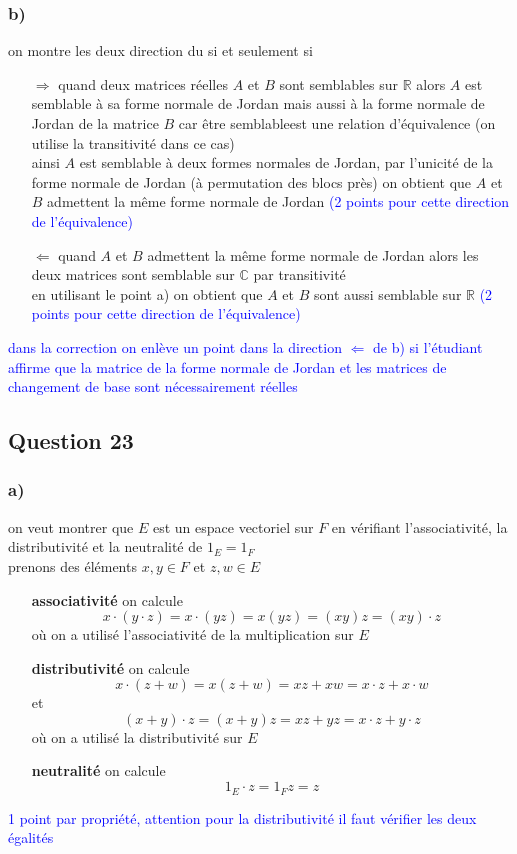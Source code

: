 \documentclass[11pt, a4paper, oneside]{article}
\begin{document}
\subsubsection*{b)}
on montre les deux direction du si et seulement si
\begin{itemize}
    \item [$\Longrightarrow$] quand deux matrices réelles $A$ et $B$ sont semblables sur $\mathbb{R}$ alors $A$ est semblable à sa forme normale de Jordan mais aussi à la forme normale de Jordan de la matrice $B$ car \flqq être semblable\frqq est une relation d'équivalence {\tiny (on utilise la transitivité dans ce cas)} \\
    ainsi $A$ est semblable à deux formes normales de Jordan, par l'unicité {\tiny de la forme normale de Jordan (à permutation des blocs près)} on obtient que $A$ et $B$ admettent la même forme normale de Jordan \textcolor{blue}{(2 points pour cette direction de l'équivalence)}

    \item [$\Longleftarrow$] quand $A$ et $B$ admettent la même forme normale de Jordan alors les deux matrices sont semblable sur $\mathbb{C}$ {\tiny par transitivité} \\
    en utilisant le point a) on obtient que $A$ et $B$ sont aussi semblable sur $\mathbb{R}$ \textcolor{blue}{(2 points pour cette direction de l'équivalence)}
\end{itemize}
\textcolor{blue}{dans la correction on enlève un point dans la direction $\Longleftarrow$ de b) si l'étudiant affirme que la matrice de la forme normale de Jordan et les matrices de changement de base sont nécessairement réelles}

\newpage

\subsection*{Question 23}
\subsubsection*{a)}
on veut montrer que $E$ est un espace vectoriel sur $F$ en vérifiant l'associativité, la distributivité et la neutralité de $1_E = 1_F$ \\
prenons des éléments $x,y \in F$ et $z,w \in E$
\begin{itemize}
    \item [\textbf{associativité}] on calcule $$x\cdot(y\cdot z) = x\cdot(yz) = x(yz) = (xy)z = (xy) \cdot z$$ où on a utilisé l'associativité de la multiplication sur $E$
    \item [\textbf{distributivité}] on calcule $$x\cdot(z+w) = x(z+w) = xz+xw = x\cdot z + x\cdot w$$
    et
    $$(x+y)\cdot z = (x+y)z = xz + yz = x\cdot z + y\cdot z$$
    où on a utilisé la distributivité sur $E$
    \item [\textbf{neutralité}] on calcule
    $$1_E\cdot z = 1_Fz = z$$
\end{itemize}
\textcolor{blue}{1 point par propriété, attention pour la distributivité il faut vérifier les deux égalités}
\end{document}
